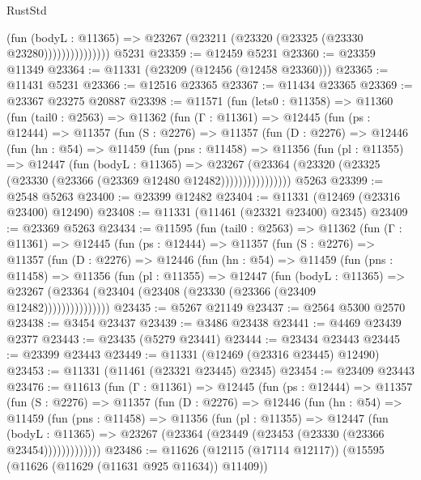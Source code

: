 \begin{lexlean}{RustStd}
\begin{coremodule}
                        (fun (bodyL : @11365) =>
                        @23267 (@23211 (@23320 (@23325 (@23330 @23280)))))))))))))))
    @5231
@23359 := @12459 @5231
@23360 := @23359 @11349
@23364 := @11331 (@23209 (@12456 (@12458 @23360)))
@23365 := @11431 @5231
@23366 := @12516 @23365
@23367 := @11434 @23365
@23369 := @23367 @23275 @20887
@23398 := @11571
    (fun (lets0 : @11358) =>
    @11360
      (fun (tail0 : @2563) =>
      @11362
        (fun (Γ : @11361) =>
        @12445
          (fun (ps : @12444) =>
          @11357
            (fun (S : @2276) =>
            @11357
              (fun (D : @2276) =>
              @12446
                (fun (hn : @54) =>
                @11459
                  (fun (pns : @11458) =>
                  @11356
                    (fun (pl : @11355) =>
                    @12447
                      (fun (bodyL : @11365) =>
                      @23267
                        (@23364
                          (@23320 (@23325 (@23330 (@23366 (@23369 @12480 @12482))))))))))))))))
    @5263
@23399 := @2548 @5263
@23400 := @23399 @12482
@23404 := @11331 (@12469 (@23316 @23400) @12490)
@23408 := @11331 (@11461 (@23321 @23400) @2345)
@23409 := @23369 @5263
@23434 := @11595
    (fun (tail0 : @2563) =>
    @11362
      (fun (Γ : @11361) =>
      @12445
        (fun (ps : @12444) =>
        @11357
          (fun (S : @2276) =>
          @11357
            (fun (D : @2276) =>
            @12446
              (fun (hn : @54) =>
              @11459
                (fun (pns : @11458) =>
                @11356
                  (fun (pl : @11355) =>
                  @12447
                    (fun (bodyL : @11365) =>
                    @23267 (@23364 (@23404 (@23408 (@23330 (@23366 (@23409 @12482)))))))))))))))
@23435 := @5267 @21149
@23437 := @2564 @5300 @2570
@23438 := @3454 @23437
@23439 := @3486 @23438
@23441 := @4469 @23439 @2377
@23443 := @23435 (@5279 @23441)
@23444 := @23434 @23443
@23445 := @23399 @23443
@23449 := @11331 (@12469 (@23316 @23445) @12490)
@23453 := @11331 (@11461 (@23321 @23445) @2345)
@23454 := @23409 @23443
@23476 := @11613
    (fun (Γ : @11361) =>
    @12445
      (fun (ps : @12444) =>
      @11357
        (fun (S : @2276) =>
        @11357
          (fun (D : @2276) =>
          @12446
            (fun (hn : @54) =>
            @11459
              (fun (pns : @11458) =>
              @11356
                (fun (pl : @11355) =>
                @12447
                  (fun (bodyL : @11365) =>
                  @23267 (@23364 (@23449 (@23453 (@23330 (@23366 @23454)))))))))))))
@23486 := @11626 (@12115 (@17114 @12117)) (@15595 (@11626 (@11629 (@11631 @925 @11634)) @11409))

\end{coremodule}
\end{lexlean}
